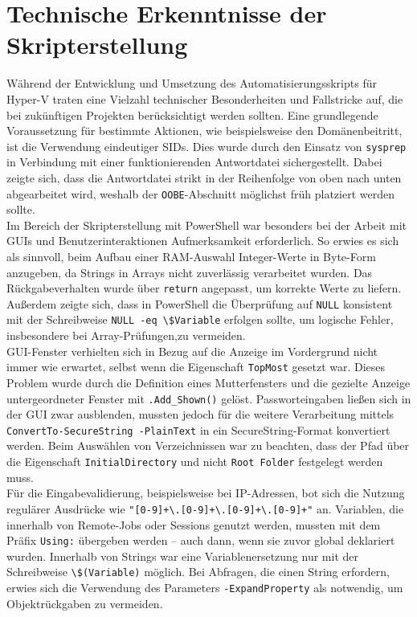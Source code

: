 \documentclass[a4paper,12pt]{article}
\begin{document}
\section{Technische Erkenntnisse der Skripterstellung}

Während der Entwicklung und Umsetzung des Automatisierungsskripts für Hyper-V traten eine Vielzahl technischer Besonderheiten und Fallstricke auf, die bei zukünftigen Projekten berücksichtigt werden sollten. Eine grundlegende Voraussetzung für bestimmte Aktionen, wie beispielsweise den Domänenbeitritt, ist die Verwendung eindeutiger SIDs. Dies wurde durch den Einsatz von \lstinline|sysprep| in Verbindung mit einer funktionierenden Antwortdatei sichergestellt. Dabei zeigte sich, dass die Antwortdatei strikt in der Reihenfolge von oben nach unten abgearbeitet wird, weshalb der \lstinline|OOBE|-Abschnitt möglichst früh platziert werden sollte.\\  


Im Bereich der Skripterstellung mit PowerShell war besonders bei der Arbeit mit GUIs und Benutzerinteraktionen Aufmerksamkeit erforderlich. So erwies es sich als sinnvoll, beim Aufbau einer RAM-Auswahl Integer-Werte in Byte-Form anzugeben, da Strings in Arrays nicht zuverlässig verarbeitet wurden. Das Rückgabeverhalten wurde über \lstinline|return| angepasst, um korrekte Werte zu liefern. Au\ss erdem zeigte sich, dass in PowerShell die Überprüfung auf \lstinline|NULL| konsistent mit der Schreibweise \lstinline|NULL -eq \$Variable| erfolgen sollte, um logische Fehler, insbesondere bei Array-Prüfungen,zu vermeiden. \\ 

GUI-Fenster verhielten sich in Bezug auf die Anzeige im Vordergrund nicht immer wie erwartet, selbst wenn die Eigenschaft \lstinline|TopMost| gesetzt war. Dieses Problem wurde durch die Definition eines Mutterfensters und die gezielte Anzeige untergeordneter Fenster mit \lstinline|.Add_Shown()| gelöst. Passworteingaben lie\ss en sich in der GUI zwar ausblenden, mussten jedoch für die weitere Verarbeitung mittels \lstinline|ConvertTo-SecureString -PlainText| in ein SecureString-Format konvertiert werden. Beim Auswählen von Verzeichnissen war zu beachten, dass der Pfad über die Eigenschaft \lstinline|InitialDirectory| und nicht \lstinline|Root Folder| festgelegt werden muss.\\  

Für die Eingabevalidierung, beispielsweise bei IP-Adressen, bot sich die Nutzung regulärer Ausdrücke wie \lstinline|"[0-9]+\.[0-9]+\.[0-9]+\.[0-9]+"| an. Variablen, die innerhalb von Remote-Jobs oder Sessions genutzt werden, mussten mit dem Präfix \lstinline|Using:| übergeben werden -- auch dann, wenn sie zuvor global deklariert wurden. Innerhalb von Strings war eine Variablenersetzung nur mit der Schreibweise \lstinline|\$(Variable)| möglich. Bei Abfragen, die einen String erfordern, erwies sich die Verwendung des Parameters \lstinline|-ExpandProperty| als notwendig, um Objektrückgaben zu vermeiden.\\  
\end{document}
